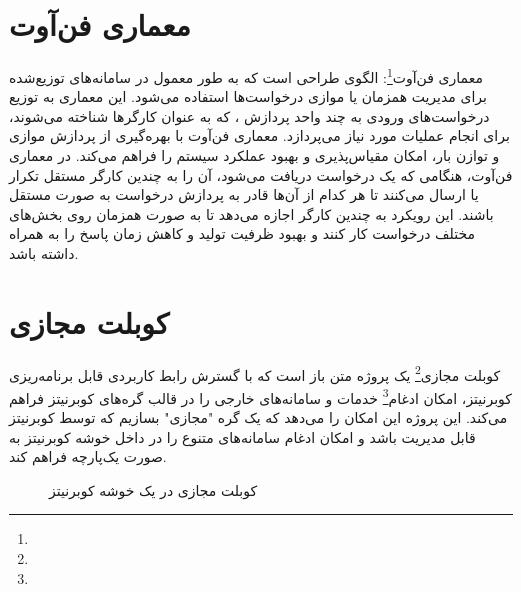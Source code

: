 \section{معماری فن‌آوت}
\label{sec:fanout}
\paragraph{}
{
    معماری فن‌آوت\footnote{}: الگوی طراحی است که به طور معمول در سامانه‌های توزیع‌شده برای مدیریت همزمان یا موازی درخواست‌ها استفاده می‌شود. این معماری به توزیع درخواست‌های ورودی به چند واحد پردازش ، که به عنوان کارگرها شناخته می‌شوند، برای انجام عملیات مورد نیاز می‌پردازد. معماری فن‌آوت با بهره‌گیری از پردازش موازی و توازن بار، امکان مقیاس‌پذیری و بهبود عملکرد سیستم را فراهم می‌کند. در معماری فن‌آوت، هنگامی که یک درخواست دریافت می‌شود، آن را به چندین کارگر مستقل تکرار یا ارسال می‌کنند تا هر کدام از آن‌ها قادر به پردازش درخواست به صورت مستقل باشند. این رویکرد به چندین کارگر اجازه می‌دهد تا به صورت همزمان روی بخش‌های مختلف درخواست کار کنند و بهبود ظرفیت تولید و کاهش زمان پاسخ را به همراه داشته باشد.
}

\section{کوبلت مجازی}
\label{sec:vritkubelet}
\paragraph{}
{
    کوبلت مجازی\footnote{} یک پروژه متن باز است که با گسترش رابط‌ کاربردی قابل برنامه‌ریزی کوبرنیتز، امکان ادغام\footnote{} خدمات و سامانه‌های خارجی را در قالب گره‌های کوبرنیتز فراهم می‌کند. این پروژه این امکان را می‌دهد که یک گره "مجازی" بسازیم که توسط کوبرنیتز قابل مدیریت باشد و امکان ادغام سامانه‌های متنوع را در داخل خوشه کوبرنیتز به صورت یک‌پارچه فراهم کند.    
    \begin{figure}[H]
     \caption{کوبلت مجازی در یک خوشه کوبرنیتز}
     \label{fig:virtkublet_arch}
    \end{figure}
}

